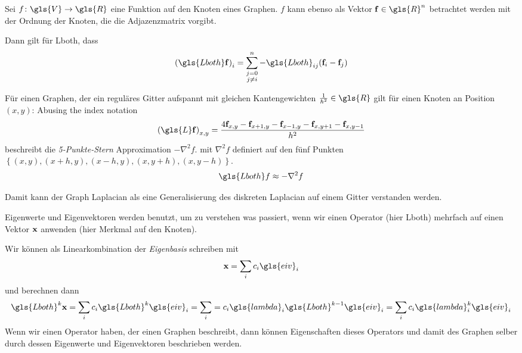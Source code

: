 Sei $f \colon \gls{V} \to \gls{R}$ eine Funktion auf den Knoten eines Graphen.
$f$ kann ebenso als Vektor $\ve{f} \in \gls{R}^n$ betrachtet werden mit der Ordnung der Knoten, die die Adjazenzmatrix vorgibt.

Dann gilt für \gls{Lboth}, dass
\begin{equation}
  {\left(\gls{Lboth}\ve{f}\right)}_i = \sum^n_{\substack{j=0\\j \neq i}} -\gls{Lboth}_{ij} \left(\ve{f}_i - \ve{f}_j\right)
\end{equation}

Für einen Graphen, der ein reguläres Gitter aufspannt mit gleichen Kantengewichten $\frac{1}{h^2} \in \gls{R}$ gilt für einen Knoten an Position $\left(x, y\right)$:
Abusing the index notation
\begin{equation}
  {\left(\gls{L}\ve{f}\right)}_{x,y} = \frac{4\ve{f}_{x,y} - \ve{f}_{x+1,y} - \ve{f}_{x-1,y} - \ve{f}_{x,y+1} - \ve{f}_{x,y-1}}{h^2}
\end{equation}
beschreibt die \emph{5-Punkte-Stern} Approximation $-\nabla^2 f$.
mit $\nabla^2 f$ definiert auf den fünf Punkten $\left\{\left(x,y\right), \left(x+h,y\right), \left(x-h,y\right), \left(x,y+h\right),\left(x,y-h\right)\right\}$.
\begin{equation}
  \gls{Lboth}f \approx - \nabla^2 f
\end{equation}


Damit kann der Graph Laplacian als eine Generalisierung des diskreten Laplacian auf einem Gitter verstanden werden.

Eigenwerte und Eigenvektoren werden benutzt, um zu verstehen was passiert, wenn wir einen Operator (hier \gls{Lboth}) mehrfach auf einen Vektor $\mathbf{x}$ anwenden (hier Merkmal auf den Knoten).

Wir können  als Linearkombination der \emph{Eigenbasis} schreiben mit
\begin{equation}
  \ve{x} = \sum_i c_i \gls{eiv}_i
\end{equation}
und berechnen dann
\begin{equation}
  \gls{Lboth}^k \ve{x} = \sum_i c_i \gls{Lboth}^k \gls{eiv}_i = \sum_i = c_i \gls{lambda}_i \gls{Lboth}^{k-1} \gls{eiv}_i = \sum_i c_i \gls{lambda}_i^k \gls{eiv}_i
\end{equation}
Wenn wir einen Operator haben, der einen Graphen beschreibt, dann können Eigenschaften dieses Operators und damit des Graphen selber durch dessen Eigenwerte und Eigenvektoren beschrieben werden.

